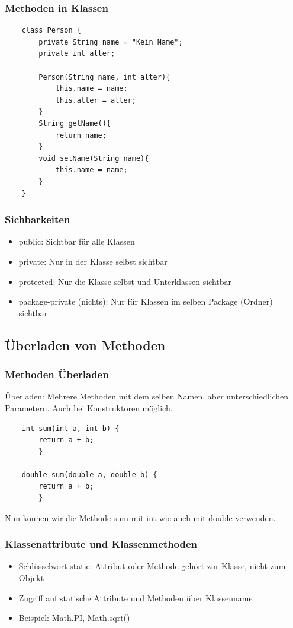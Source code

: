 \begin{frame}[fragile]
\frametitle{Methoden in Klassen}
\begin{lstlisting}
    class Person {
        private String name = "Kein Name";
        private int alter;

        Person(String name, int alter){
            this.name = name;
            this.alter = alter;
        }
        String getName(){
            return name;
        }
        void setName(String name){
            this.name = name;
        }
    }
\end{lstlisting}
\end{frame}

\begin{frame}[fragile]
\frametitle{Sichbarkeiten}
\begin{itemize}
    \item public: Sichtbar für alle Klassen
    \item private: Nur in der Klasse selbst sichtbar
    \item protected: Nur die Klasse selbst und Unterklassen sichtbar
    \item package-private (nichts): Nur für Klassen im selben Package (Ordner) sichtbar
\end{itemize}
\end{frame}

\subsection{Überladen von Methoden}
\begin{frame}[fragile]
\frametitle{Methoden Überladen}
Überladen: Mehrere Methoden mit dem selben Namen, aber unterschiedlichen Parametern. Auch bei Konstruktoren möglich.
\begin{lstlisting}
    int sum(int a, int b) {
        return a + b;
        }

    double sum(double a, double b) {
        return a + b;
        }

\end{lstlisting}
Nun können wir die Methode sum mit int wie auch mit double verwenden.
\end{frame}

\begin{frame}[fragile]
\frametitle{Klassenattribute und Klassenmethoden}
\begin{itemize}
    \item Schlüsselwort static: Attribut oder Methode gehört zur Klasse, nicht zum Objekt
    \item Zugriff auf statische Attribute und Methoden über Klassenname
    \item Beispiel: Math.PI, Math.sqrt()
\end{itemize}
\end{frame}

